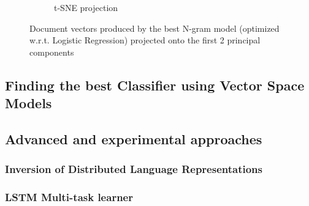 \begin{figure}[h]
\begin{subfigure}[b]{0.48\textwidth}
      \caption{t-SNE projection}
      \label{fig:exp-vector-space-ngram-tsne}
    \end{subfigure}
    \caption{Document vectors produced by the best N-gram model (optimized w.r.t. Logistic Regression) projected onto the first 2 principal components}
  \label{fig:exp-vector-space-ngram}
\end{figure}



\subsection{Finding the best Classifier using Vector Space Models}

\subsection{Advanced and experimental approaches}

\subsubsection{Inversion of Distributed Language Representations}

\subsubsection{LSTM Multi-task learner}
\label{subs:LSTM Multi-task learner}
